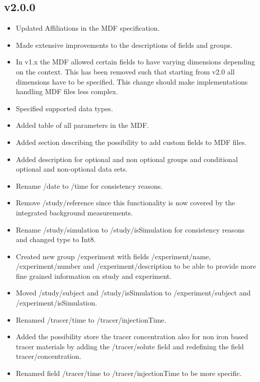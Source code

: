 \documentclass[landscape,a4paper]{article} %
\newcommand{\inlvar}[1]{{\ttfamily#1}}
\begin{document}
\begin{multicols}{2}
\subsection{v2.0.0}

\begin{itemize}
	\item Updated Affiliations in the MDF specification.
	\item Made extensive improvements to the descriptions of fields and groups.
	\item In v1.x the MDF allowed certain fields to have varying dimensions depending on the context. This has been removed such that starting from v2.0 all dimensions have to be specified. This change  should make implementations handling MDF files less complex. 
	\item Specified supported data types.
	\item Added table of all parameters in the MDF.
	\item Added section describing the possibility to add custom fields to MDF files.
	\item Added description for optional and non optional groups and conditional optional and non-optional data sets.
	\item Rename \inlvar{/date} to \inlvar{/time} for consistency reasons.
	\item Remove \inlvar{/study/reference} since this functionality is now covered by the integrated background measurements.
	\item Rename \inlvar{/study/simulation} to \inlvar{/study/isSimulation} for consistency reasons and changed type to \inlvar{Int8}.
	\item Created new group \inlvar{/experiment} with fields \inlvar{/experiment/name}, \inlvar{/experiment/number} and \inlvar{/experiment/description} to be able to provide more fine grained information on study and experiment.
	\item Moved \inlvar{/study/subject} and \inlvar{/study/isSimulation} to \inlvar{/experiment/subject} and \inlvar{/experiment/isSimulation}.
	\item Renamed \inlvar{/tracer/time} to \inlvar{/tracer/injectionTime}.
	\item Added the possibility store the tracer concentration also for non iron based tracer materials by adding the \inlvar{/tracer/solute} field and redefining the field \inlvar{tracer/concentration}.
	\item Renamed field \inlvar{/tracer/time} to \inlvar{/tracer/injectionTime} to be more specific.

\end{itemize}
\end{multicols}
\end{document}
